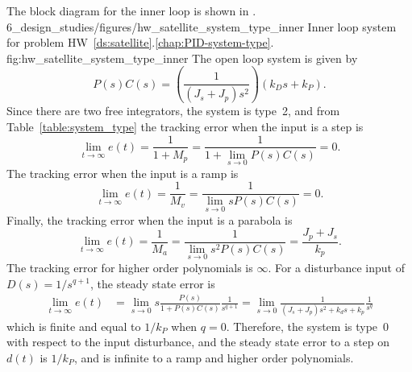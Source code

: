 
The block diagram for the inner loop is shown in .
	{6_design_studies/figures/hw_satellite_system_type_inner}
	{Inner loop system for problem HW~\ref{ds:satellite}.\ref{chap:PID-system-type}.}
	{fig:hw_satellite_system_type_inner}
The open loop system is given by
\[
P(s)C(s) = \left(\frac{1}{(J_s + J_p)s^2}\right)\left(k_Ds+k_P\right).
\]
Since there are two free integrators, the system is type~2, and from Table~\ref{table:system_type} the tracking error when the input is a step is \[
\lim_{t\to\infty}e(t) = \frac{1}{1+M_p} = \frac{1}{1+\lim_{s\to 0} P(s)C(s)} = 0.
\]
The tracking error when the input is a ramp is \[
\lim_{t\to\infty}e(t) = \frac{1}{M_v} = \frac{1}{\lim_{s\to 0} sP(s)C(s)} = 0.
\]
Finally, the tracking error when the input is a parabola is \[
\lim_{t\to\infty}e(t) = \frac{1}{M_a} = \frac{1}{\lim_{s\to 0} s^2P(s)C(s)} = \frac{J_p + J_s}{k_p}.
\]
The tracking error for higher order polynomials is $\infty$.
For a disturbance input of $D(s)=1/s^{q+1}$, the steady state error is
\begin{align*}
\lim_{t\to\infty}e(t) &= \lim_{s\to 0}s\frac{P(s)}{1+P(s)C(s)}\frac{1}{s^{q+1}} 
= \lim_{s\to 0}\frac{1}{(J_s+J_p)s^2+k_ds+k_p}\frac{1}{s^q}
\end{align*}
which is finite and equal to $1/k_P$ when $q=0$.  Therefore, the system is type~0 with respect to the input disturbance, and the steady state error to a step on $d(t)$ is $1/k_P$, and is infinite to a ramp and higher order polynomials.

